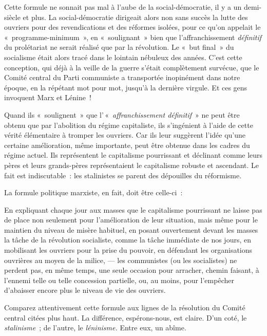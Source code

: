 \documentclass[french,twoside]{book} %
\newenvironment{quoteblock}%
  {\begin{quoting}}
  {\end{quoting}}
\newenvironment{quotebar}{%
    \def\FrameCommand{{\color{rubric!10!}\vrule width 0.5em} \hspace{0.9em}}%
    \def\OuterFrameSep{\itemsep} %
    \MakeFramed {\advance\hsize-\width \FrameRestore}
  }%
  {%
    \endMakeFramed
  }
\renewenvironment{quoteblock}%
  {%
    \savenotes
    \setstretch{0.9}
    \normalfont
    \begin{quotebar}
  }
  {%
    \end{quotebar}
    \spewnotes
  }
\begin{document}
\noindent Cette formule ne sonnait pas mal à l’aube de la social-démocratie, il y a un demi-siècle et plus. La social-démocratie dirigeait alors non sans succès la lutte des ouvriers pour des revendications et des réformes isolées, pour ce qu’on appelait le « programme-minimum », en « soulignant » bien que l’affranchissement \emph{définitif} du prolétariat ne serait réalisé que par la révolution. Le « but final » du socialisme était alors tracé dans le lointain nébuleux des années. C’est cette conception, qui déjà à la veille de la guerre s’était complètement survécue, que le Comité central du Parti communiste a transportée inopinément dans notre époque, en la répétant mot pour mot, jusqu’à la dernière virgule. Et ces gens invoquent Marx et Lénine !\par
Quand ils « soulignent » que l’ « \emph{affranchissement définitif} » ne peut être obtenu que par l’abolition du régime capitaliste, ils s’ingénient à l’aide de cette vérité élémentaire à tromper les ouvriers. Car ils leur suggèrent l’idée qu’une certaine amélioration, même importante, peut être obtenue dans les cadres du régime actuel. Ils représentent le capitalisme pourrissant et déclinant comme leurs pères et leurs grands-pères représentaient le capitalisme robuste et ascendant. Le fait est indiscutable : les stalinistes se parent des dépouilles du réformisme.\par
La formule politique marxiste, en fait, doit être celle-ci :\par
 
\begin{quoteblock}
 \noindent En expliquant chaque jour aux masses que le capitalisme pourrissant ne laisse pas de place non seulement pour l’amélioration de leur situation, mais même pour le maintien du niveau de misère habituel, en posant ouvertement devant les masses la tâche de la révolution socialiste, comme la tâche immédiate de nos jours, en mobilisant les ouvriers pour la prise du pouvoir, en défendant les organisations ouvrières au moyen de la milice, — les communistes (ou les socialistes) ne perdent pas, en même temps, une seule occasion pour arracher, chemin faisant, à l’ennemi telle ou telle concession partielle, ou, au moins, pour l’empêcher d’abaisser encore plus le niveau de vie des ouvriers.
 \end{quoteblock}

\noindent Comparez attentivement cette formule aux lignes de la résolution du Comité central citées plus haut. La différence, espérons-nous, est claire. D’un coté, le \emph{stalinisme} ; de l’autre, le \emph{léninisme.} Entre eux, un abîme.
\end{document}
